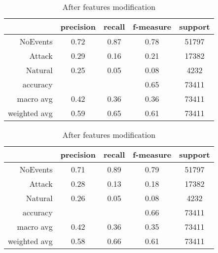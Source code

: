 \begin{table}[H]
    \centering
    \footnotesize
    \caption{Features modification results for Random Forest classifier} \label{tab:fm_rf}
    \begin{subtable}[t]{.5\linewidth}
        \centering
        \caption{Before features modification} 
        \begin{tabular}{rcccc}\toprule
            & precision    &recall & f-measure  & support \\\midrule
            NoEvents   &    0.72  &    0.87 &     0.78 &  51797 \\
            Attack     &  0.29    &  0.16   &   0.21   &  17382 \\
           Natural     &  0.25    &  0.05   &   0.08   &   4232 \\
          accuracy     &          &         &   0.65   &  73411 \\
         macro avg     &  0.42    &  0.36   &   0.36   &  73411 \\
      weighted avg     &  0.59    &  0.65   &   0.61   &  73411 \\ \bottomrule
        \end{tabular}
    \end{subtable}%
    \begin{subtable}[t]{.5\linewidth}
        \centering
        \caption{After features modification}
        \begin{tabular}{rcccc}\toprule
            &precision   & recall & f-measure &  support  \\\midrule
            NoEvents  &     0.71 &     0.89 &     0.79 &  51797\\
            Attack    &   0.28   &   0.13   &   0.18   &  17382\\
           Natural    &   0.26   &   0.05   &   0.08   &   4232\\
          accuracy    &          &          &   0.66   &  73411\\
         macro avg    &   0.42   &   0.36   &   0.35   &  73411\\
      weighted avg    &   0.58   &   0.66   &   0.61   &  73411\\     \bottomrule   
        \end{tabular}
    \end{subtable}
\end{table}


